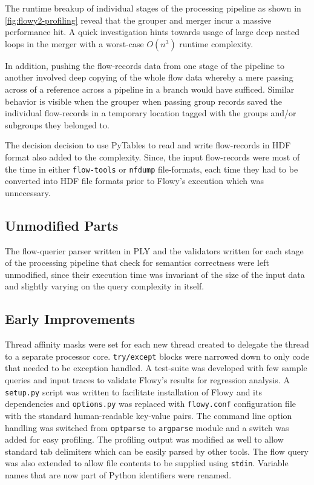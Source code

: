 The runtime breakup of individual stages of the processing pipeline as shown in \ref{fig:flowy2-profiling} reveal that the grouper and merger incur a massive performance hit. A quick investigation hints towards usage of large deep nested loops in the merger with a worst-case $O(n^3)$ runtime complexity.

In addition, pushing the flow-records data from one stage of the pipeline to another involved deep copying of the whole flow data whereby a mere passing across of a reference across a pipeline in a branch would have sufficed. Similar behavior is visible when the grouper when passing group records saved the individual flow-records in a temporary location tagged with the groups and/or subgroups they belonged to.

The decision decision to use PyTables to read and write flow-records in \ac{HDF} format also added to the complexity. Since, the input flow-records were most of the time in either \texttt{flow-tools} or \texttt{nfdump} file-formats, each time they had to be converted into \ac{HDF} file formats prior to Flowy's execution which was unnecessary.

\subsection{Unmodified Parts}\label{subsec:unmodified-parts}
The flow-querier parser written in \ac{PLY} and the validators written for each stage of the processing pipeline that check for semantics correctness were left unmodified, since their execution time was invariant of the size of the input data and slightly varying on the query complexity in itself.

\subsection{Early Improvements}\label{subsec:early-improvements}
Thread affinity masks were set for each new thread created to delegate the thread to a separate processor core. \texttt{try/except} blocks were narrowed down to only code that needed to be exception handled. A test-suite was developed with few sample queries and input traces to validate Flowy's results for regression analysis. A \texttt{setup.py} script was written to facilitate installation of Flowy and its dependencies and \texttt{options.py} was replaced with \texttt{flowy.conf} configuration file with the standard human-readable key-value pairs. The command line option handling was switched from \texttt{optparse} to \texttt{argparse} module and a switch was added for easy profiling. The profiling output was modified as well to allow standard tab delimiters which can be easily parsed by other tools. The flow query was also  extended to allow file contents to be supplied using \texttt{stdin}. Variable names that are now part of Python identifiers were renamed. 

